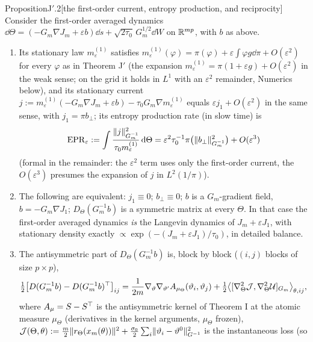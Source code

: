 \begin{thm}{Proposition}{J$'$.2}[the first-order current, entropy production, and reciprocity]
Consider the first-order averaged dynamics
$\dd\Theta = (-G_m\nabla J_m + \varepsilon b)\dd s + \sqrt{2\tau_0}\,G_m^{1/2}\dd W$ on $\mathbb{R}^{mp}$, with $b$ as above.
\begin{enumerate}[label=\textup{(\roman*)}]
  \item Its stationary law $m^{(1)}_\varepsilon$ satisfies
    $m^{(1)}_\varepsilon(\varphi) = \pi(\varphi) + \varepsilon\int\varphi g\dd\pi + O(\varepsilon^2)$ for every
    $\varphi$ as in Theorem J$'$ (the expansion $m^{(1)}_\varepsilon = \pi(1 + \varepsilon g) + O(\varepsilon^2)$ in
    the weak sense; on the grid it holds in $L^1$ with an $\varepsilon^2$ remainder, Numerics below), and its
    stationary current $j := m^{(1)}_\varepsilon(-G_m\nabla J_m + \varepsilon b) - \tau_0G_m\nabla m^{(1)}_\varepsilon$
    equals $\varepsilon j_1 + O(\varepsilon^2)$ in the same sense, with $j_1 = \pi b_\perp$; its entropy production
    rate (in slow time) is
    \[
      \mathrm{EPR}_\varepsilon := \int\frac{\lVert j\rVert^2_{G_m^{-1}}}{\tau_0m^{(1)}_\varepsilon}\,\mathrm{d}\Theta
      = \varepsilon^2\tau_0^{-1}\pi\bigl(\lVert b_\perp\rVert^2_{G_m^{-1}}\bigr) + O(\varepsilon^3)
    \]
    (formal in the remainder: the $\varepsilon^2$ term uses only the first-order current, the $O(\varepsilon^3)$
    presumes the expansion of $j$ in $L^2(1/\pi)$).
  \item The following are equivalent: $j_1\equiv0$; $b_\perp\equiv0$; $b$ is a $G_m$-gradient field,
    $b = -G_m\nabla J_1$; $D_\Theta(G_m^{-1}b)$ is a symmetric matrix at every $\Theta$. In that case the first-order
    averaged dynamics \emph{is} the Langevin dynamics of $J_m + \varepsilon J_1$, with stationary density exactly
    $\propto\exp(-(J_m + \varepsilon J_1)/\tau_0)$, in detailed balance.
  \item The antisymmetric part of $D_\Theta(G_m^{-1}b)$ is, block by block ($(i,j)$ blocks of size $p\times p$),
    \[
      \tfrac12\bigl[D(G_m^{-1}b) - D(G_m^{-1}b)^\top\bigr]_{ij}
      = \frac1{2m}\nabla_\vartheta\nabla_{\vartheta'}A_{\mu_\Theta}(\vartheta_i,\vartheta_j)
      + \tfrac12\bigl\langle[\nabla^2_\Theta\mathcal{J},\nabla^2_\Theta\mathcal{U}]_{G_m}\bigr\rangle_{\theta,ij},
    \]
    where $A_\mu = S - S^\top$ is the antisymmetric kernel of Theorem I at the atomic measure $\mu_\Theta$
    (derivatives in the kernel arguments, $\mu_\Theta$ frozen),
    $\mathcal{J}(\Theta,\theta) := \frac m2\lVert r_\Theta(x_m(\theta))\rVert^2
    + \frac{\sigma_0}2\sum_i\lVert \vartheta_i - \vartheta^0\rVert^2_{G^{-1}}$ is the instantaneous loss (so

\end{enumerate}
\end{thm}
